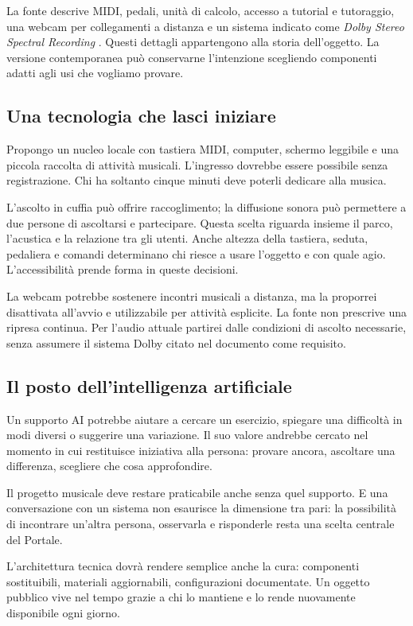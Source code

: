 La fonte descrive MIDI, pedali, unità di calcolo, accesso a tutorial
e tutoraggio, una webcam per collegamenti a distanza e un sistema
indicato come \emph{Dolby Stereo Spectral Recording}
\cite[pp.~2--3]{terzi_peeragogy_2016}. Questi dettagli appartengono
alla storia dell'oggetto. La versione contemporanea può conservarne
l'intenzione scegliendo componenti adatti agli usi che vogliamo provare.

\subsection{Una tecnologia che lasci iniziare}
Propongo un nucleo locale con tastiera MIDI, computer, schermo
leggibile e una piccola raccolta di attività musicali. L'ingresso
dovrebbe essere possibile senza registrazione. Chi ha soltanto
cinque minuti deve poterli dedicare alla musica.

L'ascolto in cuffia può offrire raccoglimento; la diffusione sonora
può permettere a due persone di ascoltarsi e partecipare. Questa
scelta riguarda insieme il parco, l'acustica e la relazione tra
gli utenti. Anche altezza della tastiera, seduta, pedaliera e
comandi determinano chi riesce a usare l'oggetto e con quale agio.
L'accessibilità prende forma in queste decisioni.

La webcam potrebbe sostenere incontri musicali a distanza, ma
la proporrei disattivata all'avvio e utilizzabile per attività
esplicite. La fonte non prescrive una ripresa continua.
Per l'audio attuale partirei dalle condizioni di ascolto necessarie,
senza assumere il sistema Dolby citato nel documento come requisito.

\subsection{Il posto dell'intelligenza artificiale}
Un supporto AI potrebbe aiutare a cercare un esercizio, spiegare
una difficoltà in modi diversi o suggerire una variazione.
Il suo valore andrebbe cercato nel momento in cui restituisce
iniziativa alla persona: provare ancora, ascoltare una differenza,
scegliere che cosa approfondire.

Il progetto musicale deve restare praticabile anche senza quel
supporto. E una conversazione con un sistema non esaurisce la
dimensione tra pari: la possibilità di incontrare un'altra persona,
osservarla e risponderle resta una scelta centrale del Portale.

L'architettura tecnica dovrà rendere semplice anche la cura:
componenti sostituibili, materiali aggiornabili, configurazioni
documentate. Un oggetto pubblico vive nel tempo grazie a chi
lo mantiene e lo rende nuovamente disponibile ogni giorno.

